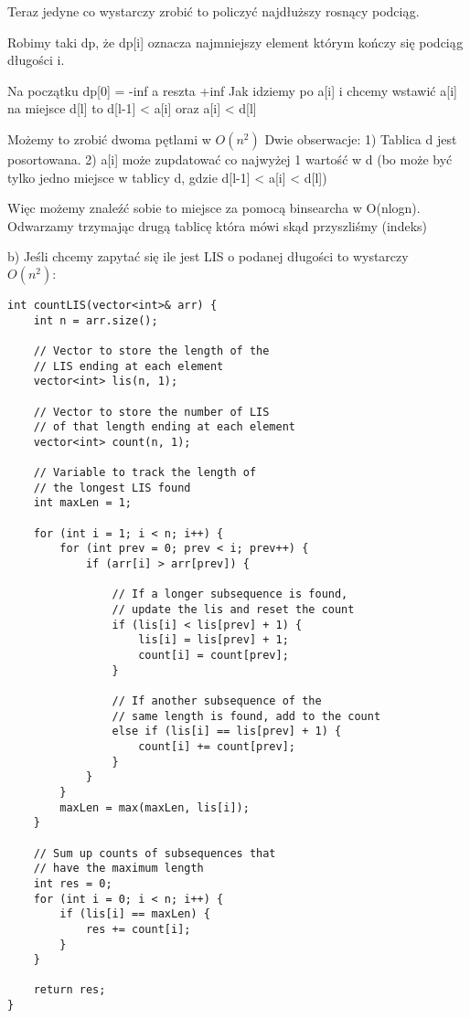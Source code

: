 \documentclass[12pt]{article}
\begin{document}
Teraz jedyne co wystarczy zrobić to policzyć najdłuższy rosnący podciąg.

Robimy taki dp, że dp[i] oznacza najmniejszy element którym kończy się podciąg długości i.

Na początku dp[0] = -inf a reszta +inf 
Jak idziemy po a[i] i chcemy wstawić a[i] na miejsce d[l] to d[l-1] < a[i] oraz a[i] < d[l]

Możemy to zrobić dwoma pętlami w $O(n^2)$
Dwie obserwacje:
1) Tablica d jest posortowana. 
2) a[i] może zupdatować co najwyżej 1 wartość w d (bo może być tylko jedno miejsce w tablicy d, gdzie d[l-1] < a[i] < d[l])

Więc możemy znaleźć sobie to miejsce za pomocą binsearcha w O(nlogn).
Odwarzamy trzymając drugą tablicę która mówi skąd przyszliśmy (indeks)


b) Jeśli chcemy zapytać się ile jest LIS o podanej długości to wystarczy \\

$O(n^2):$
\begin{lstlisting}
int countLIS(vector<int>& arr) {
    int n = arr.size();

    // Vector to store the length of the 
    // LIS ending at each element
    vector<int> lis(n, 1);

    // Vector to store the number of LIS 
    // of that length ending at each element
    vector<int> count(n, 1);

    // Variable to track the length of 
    // the longest LIS found
    int maxLen = 1;

    for (int i = 1; i < n; i++) {
        for (int prev = 0; prev < i; prev++) {
            if (arr[i] > arr[prev]) {
              
                // If a longer subsequence is found, 
                // update the lis and reset the count
                if (lis[i] < lis[prev] + 1) {
                    lis[i] = lis[prev] + 1;
                    count[i] = count[prev];
                }
              
                // If another subsequence of the 
                // same length is found, add to the count
                else if (lis[i] == lis[prev] + 1) {
                    count[i] += count[prev];
                }
            }
        }
        maxLen = max(maxLen, lis[i]);
    }

    // Sum up counts of subsequences that 
    // have the maximum length
    int res = 0;
    for (int i = 0; i < n; i++) {
        if (lis[i] == maxLen) {
            res += count[i];
        }
    }

    return res;
}
\end{lstlisting}
\end{document}

